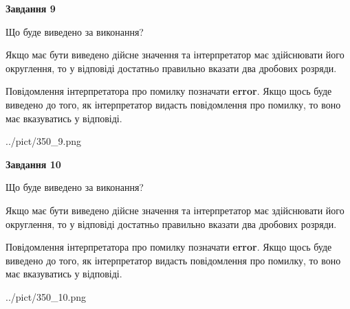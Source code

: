 \documentclass[12pt, ukrainian]{article}
\begin{document}
{\begin {Large}
{\begin {center}\textbf{Завдання 9}\end {center}}\par
Що буде виведено за виконання? \par

Якщо має бути виведено дійсне значення та інтерпретатор має здійснювати його округлення, 
то у відповіді достатньо правильно вказати два дробових розряди.

Повідомлення інтерпретатора про помилку позначати \textbf{error}.
Якщо щось буде виведено до того, як інтерпретатор видасть повідомлення про помилку, 
то воно має вказуватись у відповіді. \par

\begin{center}
	{../pict/350_9.png}
\end{center}
\newpage

{\begin {center}\textbf{Завдання 10}\end {center}}\par
Що буде виведено за виконання? \par

Якщо має бути виведено дійсне значення та інтерпретатор має здійснювати його округлення, 
то у відповіді достатньо правильно вказати два дробових розряди.

Повідомлення інтерпретатора про помилку позначати \textbf{error}.
Якщо щось буде виведено до того, як інтерпретатор видасть повідомлення про помилку, 
то воно має вказуватись у відповіді. \par

\begin{center}
	{../pict/350_10.png}
\end{center}
\newpage

\end {Large}}
\end{document}
